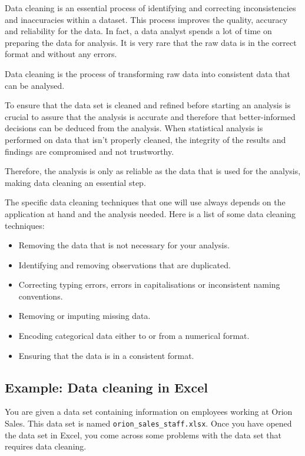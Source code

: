 \documentclass[
]{book}
\begin{document}
Data cleaning is an essential process of identifying and correcting inconsistencies and inaccuracies within a dataset. This process improves the quality, accuracy and reliability for the data. In fact, a data analyst spends a lot of time on preparing the data for analysis. It is very rare that the raw data is in the correct format and without any errors.

Data cleaning is the process of transforming raw data into consistent data that can be analysed.

To ensure that the data set is cleaned and refined before starting an analysis is crucial to assure that the analysis is accurate and therefore that better-informed decisions can be deduced from the analysis. When statistical analysis is performed on data that isn't properly cleaned, the integrity of the results and findings are compromised and not trustworthy.

Therefore, the analysis is only as reliable as the data that is used for the analysis, making data cleaning an essential step.

The specific data cleaning techniques that one will use always depends on the application at hand and the analysis needed. Here is a list of some data cleaning techniques:

\begin{itemize}
\item
  Removing the data that is not necessary for your analysis.
\item
  Identifying and removing observations that are duplicated.
\item
  Correcting typing errors, errors in capitalisations or inconsistent naming conventions.
\item
  Removing or imputing missing data.
\item
  Encoding categorical data either to or from a numerical format.
\item
  Ensuring that the data is in a consistent format.
\end{itemize}

\subsection{Example: Data cleaning in Excel}\label{example-data-cleaning-in-excel}

You are given a data set containing information on employees working at Orion Sales. This data set is named \texttt{orion\_sales\_staff.xlsx}. Once you have opened the data set in Excel, you come across some problems with the data set that requires data cleaning.
\end{document}
